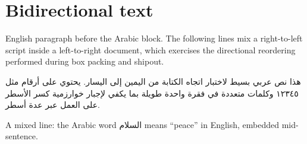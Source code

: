 \documentclass[12pt]{article}
\begin{document}
\section*{Bidirectional text}

English paragraph before the Arabic block. The following lines mix a
right-to-left script inside a left-to-right document, which exercises
the directional reordering performed during box packing and shipout.

\begin{Arabic}
هذا نص عربي بسيط لاختبار اتجاه الكتابة من اليمين إلى اليسار.
يحتوي على أرقام مثل ١٢٣٤٥ وكلمات متعددة في فقرة واحدة طويلة بما يكفي
لإجبار خوارزمية كسر الأسطر على العمل عبر عدة أسطر.
\end{Arabic}

A mixed line: the Arabic word \textarabic{السلام} means ``peace'' in
English, embedded mid-sentence.
\end{document}
